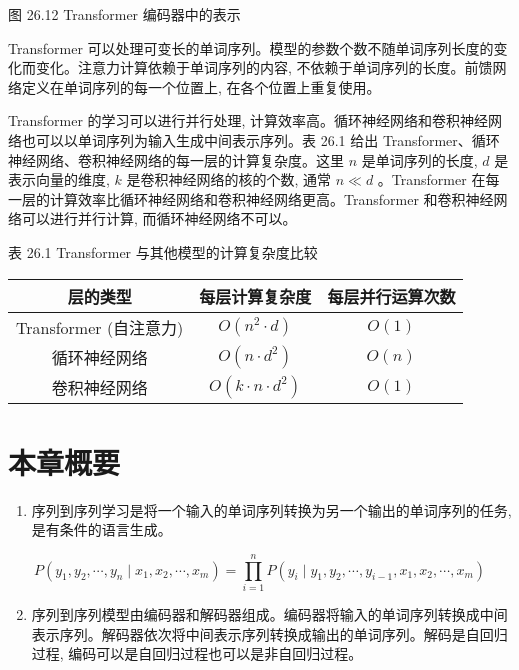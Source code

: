 \documentclass[10pt]{article}
\begin{document}
图 26.12 Transformer 编码器中的表示

Transformer 可以处理可变长的单词序列。模型的参数个数不随单词序列长度的变化而变化。注意力计算依赖于单词序列的内容, 不依赖于单词序列的长度。前馈网络定义在单词序列的每一个位置上, 在各个位置上重复使用。

Transformer 的学习可以进行并行处理, 计算效率高。循环神经网络和卷积神经网络也可以以单词序列为输入生成中间表示序列。表 26.1 给出 Transformer、循环神经网络、卷积神经网络的每一层的计算复杂度。这里 $n$ 是单词序列的长度, $d$ 是表示向量的维度, $k$ 是卷积神经网络的核的个数, 通常 $n \ll d$ 。Transformer 在每一层的计算效率比循环神经网络和卷积神经网络更高。Transformer 和卷积神经网络可以进行并行计算, 而循环神经网络不可以。

表 26.1 Transformer 与其他模型的计算复杂度比较

\begin{center}
\begin{tabular}{c|c|c}
\hline
层的类型 & 每层计算复杂度 & 每层并行运算次数 \\
\hline
Transformer (自注意力) & $O\left(n^{2} \cdot d\right)$ & $O(1)$ \\
\hline
循环神经网络 & $O\left(n \cdot d^{2}\right)$ & $O(n)$ \\
\hline
卷积神经网络 & $O\left(k \cdot n \cdot d^{2}\right)$ & $O(1)$ \\
\hline
\end{tabular}
\end{center}

\section*{本章概要}
\begin{enumerate}
  \item 序列到序列学习是将一个输入的单词序列转换为另一个输出的单词序列的任务, 是有条件的语言生成。
\end{enumerate}

$$
P\left(y_{1}, y_{2}, \cdots, y_{n} \mid x_{1}, x_{2}, \cdots, x_{m}\right)=\prod_{i=1}^{n} P\left(y_{i} \mid y_{1}, y_{2}, \cdots, y_{i-1}, x_{1}, x_{2}, \cdots, x_{m}\right)
$$

\begin{enumerate}
  \setcounter{enumi}{1}
  \item 序列到序列模型由编码器和解码器组成。编码器将输入的单词序列转换成中间表示序列。解码器依次将中间表示序列转换成输出的单词序列。解码是自回归过程, 编码可以是自回归过程也可以是非自回归过程。
\end{enumerate}
\end{document}

